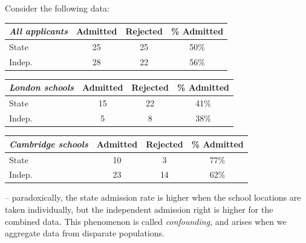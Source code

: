 \documentclass{../../template/note}
\begin{document}
    \begin{example*}
        Consider the following data:
        \begin{center}
            \begin{tabular}{l | c c c}
                \emph{All applicants} & Admitted & Rejected & \% Admitted \\
                \hline
                State & 25 & 25 & 50\% \\
                Indep. & 28 & 22 & 56\%
            \end{tabular}
        \end{center}
        \begin{center}        
            \begin{tabular}{l | c c c}
                \emph{London schools} & Admitted & Rejected & \% Admitted \\
                \hline
                State & 15 & 22 & 41\% \\
                Indep. & 5 & 8 & 38\%
            \end{tabular}
        \end{center}
        \begin{center}    
            \begin{tabular}{l | c c c}
                \emph{Cambridge schools} & Admitted & Rejected & \% Admitted \\
                \hline
                State & 10 & 3 & 77\% \\
                Indep. & 23 & 14 & 62\%
            \end{tabular}
        \end{center}
        -- paradoxically, the state admission rate is higher when the school locations are taken individually, but the independent admission right is higher for the combined data. This phenomenon is called \emph{confounding}, and arises when we aggregate data from disparate populations.


\end{example*}
\end{document}
